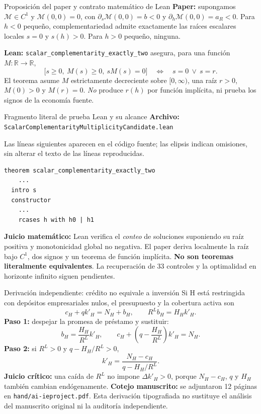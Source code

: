 \documentclass[aspectratio=169,11pt]{beamer}
\begin{document}
\begin{frame}[fragile]{Proposición del paper y contrato matemático de Lean}
\small
\textbf{Paper:} supongamos $\mathcal M\in C^1$ y
$\mathcal M(0,0)=0$, con
$\partial_s\mathcal M(0,0)=b<0$ y
$\partial_h\mathcal M(0,0)=a_R<0$.
Para $h<0$ pequeño, complementariedad admite
exactamente las raíces escalares locales $s=0$
y $s(h)>0$. Para $h>0$ pequeño, ninguna.

\medskip
\textbf{Lean:}
\texttt{scalar\_complementarity\_exactly\_two}
asegura, para una función $M:\mathbb R\to\mathbb R$,
\[
\bigl[s\geq 0,\ M(s)\geq 0,\ sM(s)=0\bigr]
\quad\Longleftrightarrow\quad
s=0\ \lor\ s=r.
\]
El teorema asume $M$ estrictamente decreciente sobre
$[0,\infty)$, una raíz $r>0$, $M(0)>0$ y $M(r)=0$.
\emph{No} produce $r(h)$ por función implícita,
ni prueba los signos de la economía fuente.
\end{frame}

\begin{frame}[fragile]{Fragmento literal de prueba Lean y su alcance}
\small
\textbf{Archivo:}
\texttt{ScalarComplementarityMultiplicityCandidate.lean}
\medskip

Las líneas siguientes aparecen en el código fuente;
las elipsis indican omisiones, sin alterar el texto de
las líneas reproducidas.
\begin{verbatim}
theorem scalar_complementarity_exactly_two
    ...
  intro s
  constructor
    ...
    rcases h with h0 | h1
\end{verbatim}

\textbf{Juicio matemático:} Lean verifica el
\emph{conteo} de soluciones suponiendo su raíz
positiva y monotonicidad global no negativa.
El paper deriva localmente la raíz bajo $C^1$,
dos signos y un teorema de función implícita.
\textbf{No son teoremas literalmente equivalentes}.
La recuperación de 33 controles y la optimalidad
en horizonte infinito siguen pendientes.
\end{frame}

\begin{frame}{Derivación independiente: crédito no equivale a inversión}
\small
Si H está restringida con depósitos empresariales nulos, el
presupuesto y la cobertura activa son
\[
c_H+qk'_H=N_H+b_H,\qquad R^L b_H=H_H k'_H.
\]
\textbf{Paso 1:} despejar la promesa de préstamo y sustituir:
\[
b_H=\frac{H_H}{R^L}k'_H,\qquad
c_H+\left(q-\frac{H_H}{R^L}\right)k'_H=N_H.
\]
\textbf{Paso 2:} si $R^L>0$ y $q-H_H/R^L>0$,
\[
k'_H=\frac{N_H-c_H}{q-H_H/R^L}.
\]
\textbf{Juicio crítico:} una caída de $R^L$ no impone
$\Delta k'_H>0$, porque $N_H-c_H$, $q$ y $H_H$
también cambian endógenamente.
\medskip
\footnotesize
\textbf{Cotejo manuscrito:} se adjuntaron 12 páginas en
\texttt{hand/ai-ieproject.pdf}. Esta derivación tipografiada no sustituye
el análisis del manuscrito original ni la auditoría independiente.
\end{frame}
\end{document}
